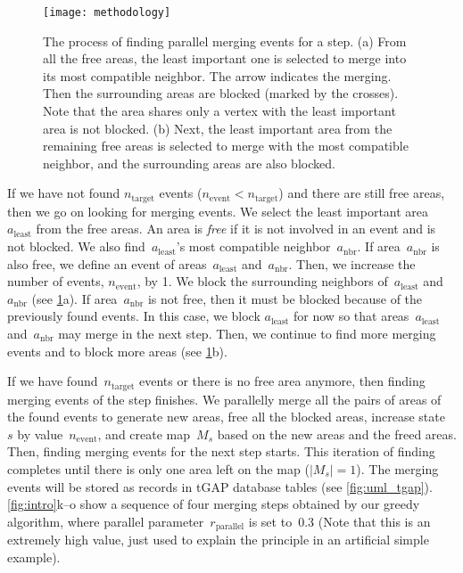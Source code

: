 \documentclass[]{interact}
\begin{document}
\begin{figure}[tb]
\centering
\texttt{[image: methodology]}
\caption{The process of finding parallel merging events for a step.
    (a) From all the free areas,
	the least important one is selected to merge into
	its most compatible neighbor.
    The arrow indicates the merging.
	Then the surrounding areas are blocked (marked by the crosses).
    Note that the area shares only a vertex with the least important area 
    is not blocked.
	(b) Next, the least important area from the remaining free areas
	is selected to merge with the most compatible neighbor,
	and the surrounding areas are also blocked.
}
\label{fig:blocked_polygons}
\end{figure}

If we have not found $n_\mathrm{target}$ events 
($n_\mathrm{event} < n_\mathrm{target}$)
and there are still free areas,
then we go on looking for merging events.
We select the least important area~$a_\mathrm{least}$
from the free areas.
An area is \emph{free} if 
it is not involved in an event and is not blocked.
We also find~$a_\mathrm{least}$'s 
most compatible neighbor~$a_\mathrm{nbr}$.
If area~$a_\mathrm{nbr}$ is also free, 
we define an event of areas~$a_\mathrm{least}$ and~$a_\mathrm{nbr}$.
Then, we increase the number of events, $n_\mathrm{event}$, by 1.
We block the surrounding neighbors of~$a_\mathrm{least}$ and~$a_\mathrm{nbr}$
(see \fig\ref{fig:blocked_polygons}a).
If area~$a_\mathrm{nbr}$ is not free,
then it must be blocked because of the previously found events.
In this case, we block $a_\mathrm{least}$ for now
so that areas~$a_\mathrm{least}$ and~$a_\mathrm{nbr}$ 
may merge in the next step.
Then, we continue to find more merging events and to block more areas
(see \fig\ref{fig:blocked_polygons}b).

If we have found~$n_\mathrm{target}$ events 
or there is no free area anymore,
then finding merging events of the step finishes.
We parallelly merge all the pairs of areas of the found events
to generate new areas,
free all the blocked areas,
increase state~$s$ by value~$n_\mathrm{event}$,
and create map~$M_s$ based on the new areas and the freed areas.
Then, finding merging events for the next step starts.
This iteration of finding completes 
until there is only one area left on the map ($|M_s|=1$).
The merging events will be stored as records in tGAP database tables
(see \fig\ref{fig:uml_tgap}).
\figs\ref{fig:intro}k--o show a sequence of four merging steps
obtained by our greedy algorithm,
where parallel parameter~$r_\mathrm{parallel}$ is set to~$0.3$
(Note that this is an extremely high value, 
just used to explain the principle in an artificial simple example).
\end{document}

